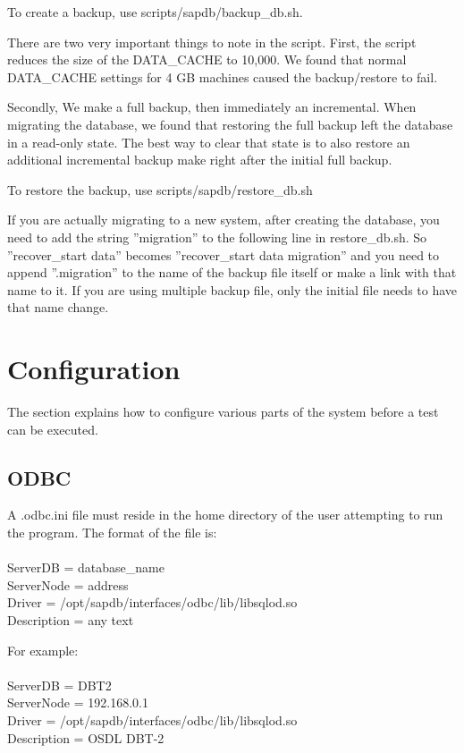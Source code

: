 \documentclass{article}
\begin{document}
\noindent
To create a backup, use scripts/sapdb/backup\_db.sh.

\noindent
There are two very important things to note in the script.  First, the script
reduces the size of the DATA\_CACHE to 10,000.   We found that normal
DATA\_CACHE settings for 4 GB machines caused the backup/restore to fail.

\noindent
Secondly, We make a full backup, then immediately an incremental.  When
migrating the database, we found that restoring the full backup left the
database in a read-only state.  The best way to clear that state is to also
restore an additional incremental backup make right after the initial full
backup.

\noindent
To restore the backup, use scripts/sapdb/restore\_db.sh

\noindent
If you are actually migrating to a new system, after creating the database,
you need to add the string ''migration'' to the following line in
restore\_db.sh.  So ''recover\_start data'' becomes
''recover\_start data migration'' and you need to append ''.migration'' to
the name of the backup file itself or make a link with that name to it.  If
you are using multiple backup file, only the initial file needs to have that
name change.

\section{Configuration}

The section explains how to configure various parts of the system before a
test can be executed.

\subsection{ODBC}

A .odbc.ini file must reside in the home directory of the user
attempting to run the program.  The format of the file is: \\
\indent [alias] \\
\indent ServerDB = database\_name \\
\indent ServerNode = address \\
\indent Driver = /opt/sapdb/interfaces/odbc/lib/libsqlod.so \\
\indent Description = any text

\noindent
\indent For example: \\
\indent [dbt2] \\
\indent ServerDB = DBT2 \\
\indent ServerNode = 192.168.0.1 \\
\indent Driver = /opt/sapdb/interfaces/odbc/lib/libsqlod.so \\
\indent Description = OSDL DBT-2
\end{document}
